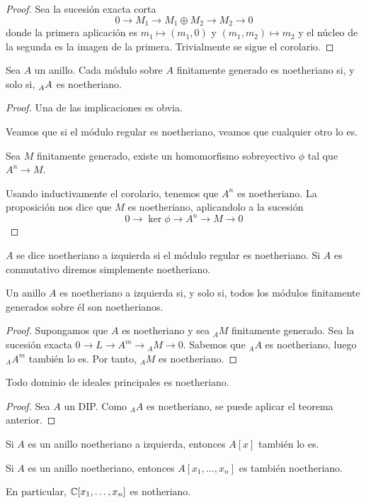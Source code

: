 \begin{proof}
  Sea la sucesión exacta corta
  \[
    0\longrightarrow M_1\longrightarrow M_1\oplus M_2\longrightarrow M_2
    \longrightarrow 0
  \]
  donde la primera aplicación es \(m_1\mapsto(m_1,0)\)
  y \((m_1,m_2)\mapsto m_2\) y el núcleo de la segunda es la imagen de
  la primera. Trivialmente se sigue el corolario.
\end{proof}

\begin{teo}
  Sea \(A\) un anillo. Cada módulo sobre \(A\) finitamente generado
  es noetheriano si, y solo si, \(\prescript{}{A}{A}\) es noetheriano.
\end{teo}

\begin{proof}
  Una de las implicaciones es obvia.

  Veamos que si el módulo regular es noetheriano, veamos que cualquier otro
  lo es.

  Sea \(M\) finitamente generado, existe un homomorfismo sobreyectivo \(\phi\)
  tal que \(A^n\longrightarrow M\).

  Usando inductivamente el corolario, tenemos que \(A^n\) es noetheriano.
  La proposición nos dice que \(M\) es noetheriano, aplicandolo
  a la sucesión
  \[
    0\longrightarrow\ker\phi\longrightarrow A^n\longrightarrow
    M\longrightarrow 0
  \]
\end{proof}

\begin{df}
  \(A\) se dice noetheriano a izquierda si el módulo regular es
  noetheriano. Si \(A\) es conmutativo diremos simplemente noetheriano.
\end{df}

\begin{teo}
  Un anillo \(A\) es noetheriano a izquierda si, y solo si, todos los módulos
  finitamente generados sobre él son noetherianos.
\end{teo}

\begin{proof}
  Supongamos que \(A\) es noetheriano y sea \({}_AM\) finitamente generado. Sea la
  sucesión exacta \(0 \longrightarrow L \longrightarrow A^m \longrightarrow {}_AM
  \longrightarrow 0\). Sabemos que \({}_AA\) es noetheriano, luego \({}_AA^m\) también
  lo es. Por tanto, \({}_AM\) es noetheriano.
\end{proof}

\begin{cor}
  Todo dominio de ideales principales es noetheriano.
\end{cor}
\begin{proof}
  Sea \(A\) un DIP. Como \({}_AA\) es noetheriano, se puede aplicar el
  teorema anterior.
\end{proof}

\begin{prop}
  Si \(A\) es un anillo noetheriano a izquierda, entonces \(A[x]\) también lo es.
\end{prop}

\begin{cor}
  Si \(A\) es un anillo noetheriano, entonces \(A[x_1, \ldots, x_n]\) es también
  noetheriano.
\end{cor}

En particular, \(\mathbb{C}[x_1, \ldots, x_n]\) es notheriano.